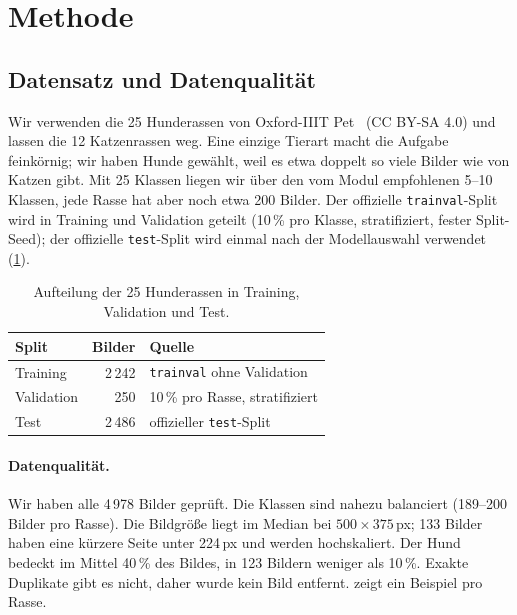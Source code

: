 \section{Methode}
\label{sec:method}

\subsection{Datensatz und Datenqualität}
Wir verwenden die 25 Hunderassen von Oxford-IIIT Pet~\cite{parkhi2012pets} (CC BY-SA 4.0) und lassen
die 12 Katzenrassen weg. Eine einzige Tierart macht die Aufgabe feinkörnig; wir haben Hunde gewählt, weil es
etwa doppelt so viele Bilder wie von Katzen gibt. Mit 25 Klassen liegen wir über den vom Modul empfohlenen 5--10
Klassen, jede Rasse hat aber noch etwa 200 Bilder. Der offizielle \texttt{trainval}-Split wird in
Training und Validation geteilt (10\,\% pro Klasse, stratifiziert, fester Split-Seed); der offizielle
\texttt{test}-Split wird einmal nach der Modellauswahl verwendet (\cref{tab:splits}).

\begin{table}[t]
  \centering
  \caption{Aufteilung der 25 Hunderassen in Training, Validation und Test.}
  \label{tab:splits}
  \small
  \begin{tabular}{lrl}
    \toprule
    Split & Bilder & Quelle \\
    \midrule
    Training   & 2\,242 & \texttt{trainval} ohne Validation \\
    Validation & 250    & 10\,\% pro Rasse, stratifiziert \\
    Test       & 2\,486 & offizieller \texttt{test}-Split \\
    \bottomrule
  \end{tabular}
\end{table}

\paragraph{Datenqualität.}
Wir haben alle 4\,978 Bilder geprüft. Die Klassen sind nahezu balanciert
(189--200 Bilder pro Rasse). Die Bildgröße liegt im Median bei $500\times375$\,px; 133 Bilder haben eine kürzere Seite unter
224\,px und werden hochskaliert. Der Hund bedeckt im Mittel 40\,\% des Bildes, in 123 Bildern weniger als
10\,\%. Exakte Duplikate gibt es nicht, daher wurde kein Bild entfernt.  zeigt ein
Beispiel pro Rasse.

